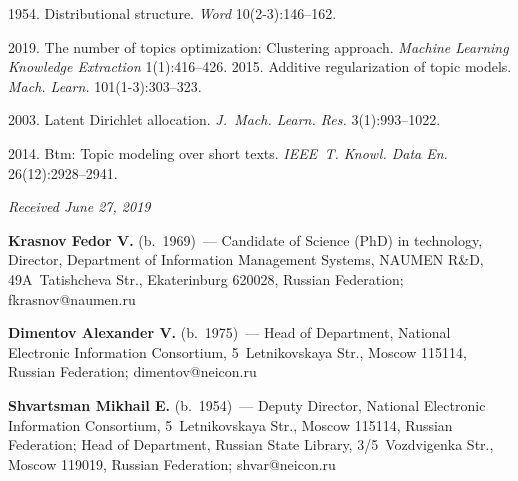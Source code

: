 \begin{multicols}{2}
{{\begin{thebibliography}{99}
 
 
 
 1954. Distributional structure. \textit{Word} 10(2-3):146--162.
 

 2019. 
The number of topics optimization: Clustering approach. 
\textit{Machine Learning Knowledge Extraction} 1(1):416--426.
 2015. 
Additive regularization of topic models. 
\textit{Mach. Learn.} 101(1-3):303--323.
{

}

 2003. 
Latent Dirichlet allocation. \textit{J.~Mach. Learn. Res.}
 3(1):993--1022.
 {
 
 }
 
 2014. Btm: Topic modeling over short texts. 
 \textit{IEEE~T. Knowl. Data En.} 26(12):2928--2941.
 \end{thebibliography}

 }
 }

\end{multicols}

\vspace*{-6pt}

\hfill{\small\textit{Received June 27, 2019}}



\Contr

\noindent
\textbf{Krasnov Fedor V.} (b.\ 1969)~--- 
Candidate of Science (PhD) in technology,
Director,  Department of Information Management Systems,
NAUMEN R\&D, 49A~Tatishcheva Str.,
Ekaterinburg 620028, Russian Federation; 
\mbox{fkrasnov@naumen.ru}

\vspace*{6pt}

\noindent
\textbf{Dimentov Alexander V.} (b.\ 1975)~--- 
Head of Department, National Electronic Information Consortium, 
5~Letnikovskaya Str., Moscow 115114, Russian Federation; 
\mbox{dimentov@neicon.ru}


\vspace*{6pt}

\noindent
\textbf{Shvartsman Mikhail E.} (b.\ 1954)~--- 
Deputy Director, National Electronic Information Consortium, 
5~Letnikovskaya Str., Moscow 115114, Russian Federation; 
Head of Department, Russian State Library, 3/5~Vozdvigenka Str., 
Moscow 119019, Russian Federation; \mbox{shvar@neicon.ru}
\label{end\stat}

\renewcommand{\bibname}{\protect\rm Литература} 